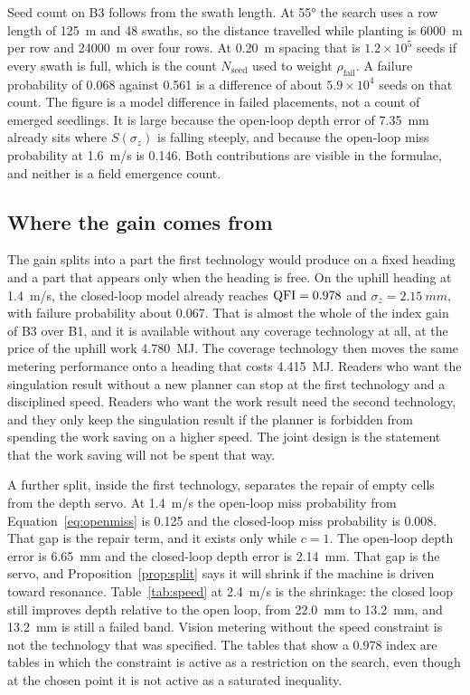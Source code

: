 Seed count on B3 follows from the swath length. At \ang{55} the search uses a row length of \SI{125}{m} and \num{48} swaths, so the distance travelled while planting is \SI{6000}{m} per row and \SI{24000}{m} over four rows. At \SI{0.20}{m} spacing that is \(1.2\times 10^{5}\) seeds if every swath is full, which is the count \(N_{\mathrm{seed}}\) used to weight \(\rho_{\mathrm{fail}}\). A failure probability of \num{0.068} against \num{0.561} is a difference of about \(5.9\times 10^{4}\) seeds on that count. The figure is a model difference in failed placements, not a count of emerged seedlings. It is large because the open-loop depth error of \SI{7.35}{mm} already sits where \(S(\sigma_z)\) is falling steeply, and because the open-loop miss probability at \SI{1.6}{m/s} is \num{0.146}. Both contributions are visible in the formulae, and neither is a field emergence count.

\subsection{Where the gain comes from}

The gain splits into a part the first technology would produce on a fixed heading and a part that appears only when the heading is free. On the uphill heading at \SI{1.4}{m/s}, the closed-loop model already reaches \(\mathrm{QFI}=\num{0.978}\) and \(\sigma_z=\SI{2.15}{mm}\), with failure probability about \num{0.067}. That is almost the whole of the index gain of B3 over B1, and it is available without any coverage technology at all, at the price of the uphill work \SI{4.780}{MJ}. The coverage technology then moves the same metering performance onto a heading that costs \SI{4.415}{MJ}. Readers who want the singulation result without a new planner can stop at the first technology and a disciplined speed. Readers who want the work result need the second technology, and they only keep the singulation result if the planner is forbidden from spending the work saving on a higher speed. The joint design is the statement that the work saving will not be spent that way.

A further split, inside the first technology, separates the repair of empty cells from the depth servo. At \SI{1.4}{m/s} the open-loop miss probability from Equation~\eqref{eq:openmiss} is \num{0.125} and the closed-loop miss probability is \num{0.008}. That gap is the repair term, and it exists only while \(c=1\). The open-loop depth error is \SI{6.65}{mm} and the closed-loop depth error is \SI{2.14}{mm}. That gap is the servo, and Proposition~\ref{prop:split} says it will shrink if the machine is driven toward resonance. Table~\ref{tab:speed} at \SI{2.4}{m/s} is the shrinkage: the closed loop still improves depth relative to the open loop, from \SI{22.0}{mm} to \SI{13.2}{mm}, and \SI{13.2}{mm} is still a failed band. Vision metering without the speed constraint is not the technology that was specified. The tables that show a \num{0.978} index are tables in which the constraint is active as a restriction on the search, even though at the chosen point it is not active as a saturated inequality.

